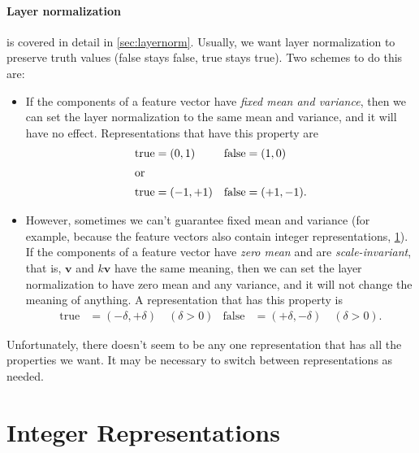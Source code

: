 \paragraph{Layer normalization} is covered in detail in \cref{sec:layernorm}. Usually, we want layer normalization to preserve truth values (false stays false, true stays true). Two schemes to do this are:
\begin{itemize}
\item If the components of a feature vector have \emph{fixed mean and variance}, then we can set the layer normalization to the same mean and variance, and it will have no effect. Representations that have this property are
  \begin{align*}
    \text{true} &= (0, 1) & \text{false} &= (1, 0) \\
    \intertext{or}
    \text{true} &= (-1, +1) & \text{false} &= (+1, -1).
  \end{align*}
\item However, sometimes we can't guarantee fixed mean and variance (for example, because the feature vectors also contain integer representations, \cref{sec:integers}). If the components of a feature vector have \emph{zero mean} and are \emph{scale-invariant}, that is, $\mathbf{v}$ and $k\mathbf{v}$ have the same meaning, then we can set the layer normalization to have zero mean and any variance, and it will not change the meaning of anything. A representation that has this property is
  \begin{align*}
    \text{true} &= (-\delta, +\delta) \quad (\delta>0) & \text{false} &= (+\delta, -\delta) \quad (\delta>0).
  \end{align*}
\end{itemize}

Unfortunately, there doesn't seem to be any one representation that has all the properties we want. It may be necessary to switch between representations as needed.

\section{Integer Representations}
\label{sec:integers}
